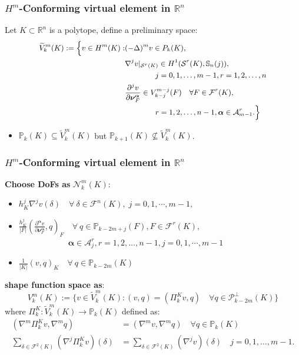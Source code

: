 \documentclass[notheorems,serif]{beamer}
\begin{document}
\begin{frame}
    \frametitle{$H^m$-Conforming virtual element in $\mathbb{R}^n$}
    Let $K \subset \mathbb{R}^n$ is a polytope, define a preliminary space:
    $$
    \small{
    \begin{aligned}
      \widetilde{V}_k^m(K) := \Big\{v \in  H^m(K) :&  (-\Delta)^m v \in P_k(K),\\
          & \nabla^j v|_{\mathcal{S}^r(K)} \in H^1(\mathcal{S}^r(K),\mathbb{S}_n(j)), \\
          & \qquad\qquad j = 0, 1, \dots, m-1, r = 1, 2, \dots, n\\
          & \frac{\partial^j v}{\partial
          \boldsymbol{\nu}_F^{\boldsymbol{\alpha}}} \in V_{k-j}^{m-j}(F) \quad 
          \forall F \in \mathcal{F}^r(K), \\
          &\qquad\qquad r = 1, 2, \dots, n-1, \boldsymbol{\alpha} \in \mathcal{A}_{m-1}^r.
          \Big\}
    \end{aligned}
    }
    $$
    \begin{itemize}
        \item $\mathbb{P}_k(K) \subseteq \widetilde{V}_k^m(K)$ but 
            $\mathbb{P}_{k+1}(K) \not\subseteq \widetilde{V}_k^m(K)$.
    \end{itemize}
\end{frame}
\begin{frame}
    \frametitle{$H^m$-Conforming virtual element in $\mathbb{R}^n$}
    \textbf{Choose DoFs as} $\mathcal{N}_k^m(K)$:
  \begin{itemize}
    \item $h_K^j\nabla^{j}v(\delta) \quad\forall~\delta\in\mathcal F^{n}(K),\;
         j=0,1,\cdots,m-1,$
    \item $\frac{h_K^{j}}{|F|}(
        \frac{\partial^{\boldsymbol{\alpha}}v}{\partial
    \boldsymbol{\nu}_F^{\boldsymbol{\alpha}}}, q)_F
        \quad\forall~q\in\mathbb P_{k-2m+j}(F), F\in\mathcal
        F^{r}(K),$\\
        $\quad\quad\quad\quad\quad\quad
        \boldsymbol{\alpha}\in \mathcal{A}_j^r, 
        r = 1, 2, \dots, n-1, j=0,1,\cdots,m-1$
    \item $\frac{1}{|K|}(v, q)_K \quad\forall~q\in\mathbb P_{k-2m}(K)$ 
  \end{itemize}
  \textbf{shape function space as}:
    $$
    V_k^m(K) := \{v \in \widetilde{V}_k^m(K): (v, q) = (\Pi_k^Kv, q) \quad 
        \forall q \in \mathcal{P}_{k-2m}^{\perp}(K)\}
    $$
where $\Pi_k^K : \widetilde{V}_k^m(K) \to \mathbb{P}_k(K)$ defined as:
$$
\begin{aligned}
    (\nabla^m \Pi_k^K v, \nabla^m q) &  = (\nabla^m v, \nabla^m q) \quad
    \forall q \in \mathbb{P}_k(K)\\
    \sum_{\delta\in\mathcal{F}^2(K)}(\nabla^j\Pi_k^K v)(\delta) & = 
    \sum_{\delta\in\mathcal{F}^2(K)}(\nabla^j v)(\delta) \quad j = 0, 1,
    \dots, m-1.
\end{aligned} 
$$
\end{frame}
\end{document}
